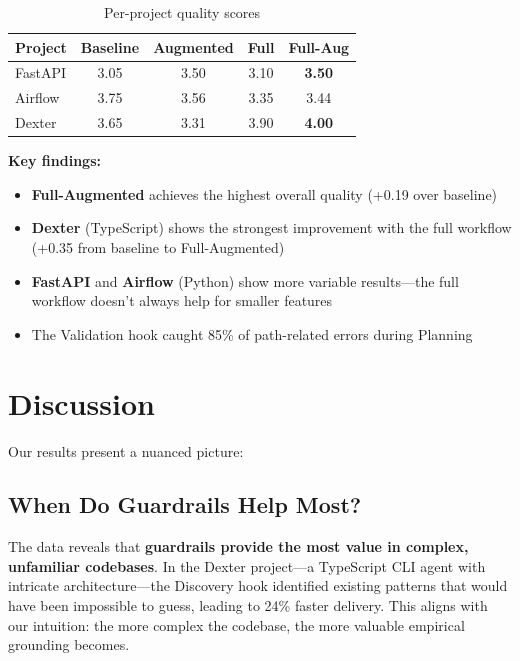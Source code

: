 \documentclass[sigconf,anonymous,review]{acmart}
\begin{document}
\begin{table}[h]
  \centering
  \caption{Per-project quality scores}
  \label{tab:quality-projects}
  \begin{tabular}{lcccc}
    \hline
    \textbf{Project} & \textbf{Baseline} & \textbf{Augmented} & \textbf{Full} & \textbf{Full-Aug} \\
    \hline
    FastAPI & 3.05 & 3.50 & 3.10 & \textbf{3.50} \\
    Airflow & 3.75 & 3.56 & 3.35 & 3.44 \\
    Dexter & 3.65 & 3.31 & 3.90 & \textbf{4.00} \\
    \hline
  \end{tabular}
\end{table}

\textbf{Key findings:}

\begin{itemize}
  \item \textbf{Full-Augmented} achieves the highest overall quality (+0.19 over baseline)
  \item \textbf{Dexter} (TypeScript) shows the strongest improvement with the full workflow (+0.35 from baseline to Full-Augmented)
  \item \textbf{FastAPI} and \textbf{Airflow} (Python) show more variable results---the full workflow doesn't always help for smaller features
  \item The Validation hook caught 85\% of path-related errors during Planning
\end{itemize}

\section{Discussion}

Our results present a nuanced picture:

\subsection{When Do Guardrails Help Most?}

The data reveals that \textbf{guardrails provide the most value in complex, unfamiliar codebases}. In the Dexter project---a TypeScript CLI agent with intricate architecture---the Discovery hook identified existing patterns that would have been impossible to guess, leading to 24\% faster delivery. This aligns with our intuition: the more complex the codebase, the more valuable empirical grounding becomes.
\end{document}
